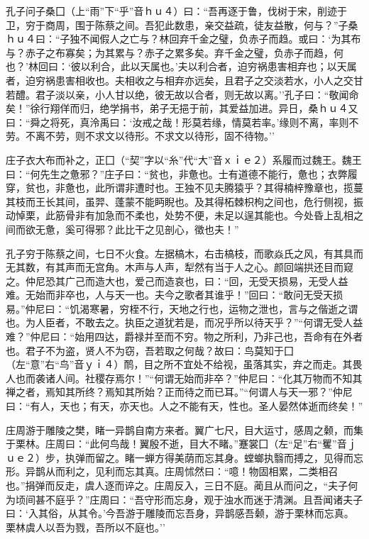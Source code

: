 \documentclass[]{article}
\begin{document}
孔子问子桑囗（上``雨''下``乎''音ｈｕ４）曰：``吾再逐于鲁，伐树于宋，削迹于卫，穷于商周，围于陈蔡之间。吾犯此数患，亲交益疏，徒友益散，何与？''子桑ｈｕ４曰：``子独不闻假人之亡与？林回弃千金之璧，负赤子而趋。或曰：`为其布与？赤子之布寡矣；为其累与？赤子之累多矣。弃千金之璧，负赤子而趋，何也？'林回曰：`彼以利合，此以天属也。'夫以利合者，迫穷祸患害相弃也；以天属者，迫穷祸患害相收也。夫相收之与相弃亦远矣，且君子之交淡若水，小人之交甘若醴。君子淡以亲，小人甘以绝，彼无故以合者，则无故以离。''孔子曰：``敬闻命矣！''徐行翔佯而归，绝学捐书，弟子无挹于前，其爱益加进。异日，桑ｈｕ４又曰：``舜之将死，真泠禹曰：`汝戒之哉！形莫若缘，情莫若率。'缘则不离，率则不劳。不离不劳，则不求文以待形。不求文以待形，固不待物。''

庄子衣大布而补之，正囗（``契''字以``糸''代``大''音ｘｉｅ２）系履而过魏王。魏王曰：``何先生之惫邪？''庄子曰：``贫也，非惫也。士有道德不能行，惫也；衣弊履穿，贫也，非惫也，此所谓非遭时也。王独不见夫腾猿乎？其得楠梓豫章也，揽蔓其枝而王长其间，虽羿、蓬蒙不能眄睨也。及其得柘棘枳枸之间也，危行侧视，振动悼栗，此筋骨非有加急而不柔也，处势不便，未足以逞其能也。今处昏上乱相之间而欲无惫，奚可得邪？此比干之见剖心，徵也夫！''

孔子穷于陈蔡之间，七日不火食。左据槁木，右击槁枝，而歌焱氏之风，有其具而无其数，有其声而无宫角。木声与人声，犁然有当于人之心。颜回端拱还目而窥之。仲尼恐其广己而造大也，爱己而造哀也，曰：``回，无受天损易，无受人益难。无始而非卒也，人与天一也。夫今之歌者其谁乎！''回曰：``敢问无受天损易。''仲尼曰：``饥渴寒暑，穷桎不行，天地之行也，运物之泄也，言与之偕逝之谓也。为人臣者，不敢去之。执臣之道犹若是，而况乎所以待天乎？''``何谓无受人益难？''仲尼曰：``始用四达，爵禄并至而不穷。物之所利，乃非己也，吾命有在外者也。君子不为盗，贤人不为窃，吾若取之何哉？故曰：鸟莫知于囗（左``意''右``鸟''音ｙｉ４）鸸，目之所不宜处不给视，虽落其实，弃之而走。其畏人也而袭诸人间。社稷存焉尔！''``何谓无始而非卒？''仲尼曰：``化其万物而不知其禅之者，焉知其所终？焉知其所始？正而待之而已耳。''``何谓人与天一邪？''仲尼曰：``有人，天也；有天，亦天也。人之不能有天，性也。圣人晏然体逝而终矣！''

庄周游于雕陵之樊，睹一异鹊自南方来者。翼广七尺，目大运寸，感周之颡，而集于栗林。庄周曰：``此何鸟哉！翼殷不逝，目大不睹。''蹇裳囗（左``足''右``矍''音ｊｕｅ２）步，执弹而留之。睹一蝉方得美荫而忘其身。螳螂执翳而搏之，见得而忘形。异鹊从而利之，见利而忘其真。庄周怵然曰：``噫！物固相累，二类相召也。''捐弹而反走，虞人逐而谇之。庄周反入，三日不庭。蔺且从而问之，``夫子何为顷间甚不庭乎？''庄周曰：``吾守形而忘身，观于浊水而迷于清渊。且吾闻诸夫子曰：`入其俗，从其令。'今吾游于雕陵而忘吾身，异鹊感吾颡，游于栗林而忘真。栗林虞人以吾为戮，吾所以不庭也。''
\end{document}
